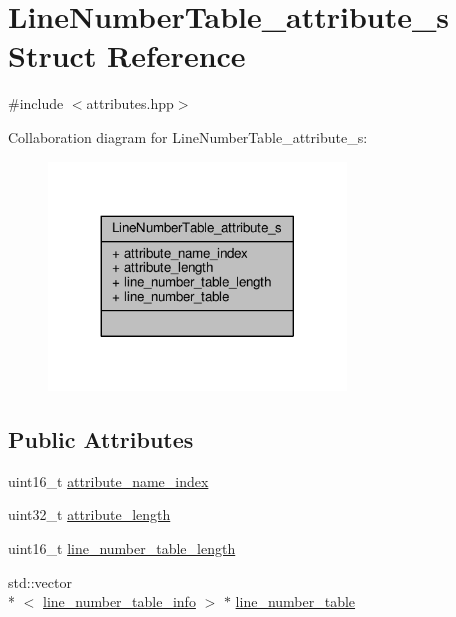 \hypertarget{structLineNumberTable__attribute__s}{\section{Line\+Number\+Table\+\_\+attribute\+\_\+s Struct Reference}
\label{structLineNumberTable__attribute__s}
}


{\ttfamily \#include $<$attributes.\+hpp$>$}



Collaboration diagram for Line\+Number\+Table\+\_\+attribute\+\_\+s\+:\nopagebreak
\begin{figure}[H]
\begin{center}
\leavevmode
\includegraphics[width=224pt]{structLineNumberTable__attribute__s__coll__graph}
\end{center}
\end{figure}
\subsection*{Public Attributes}
\begin{DoxyCompactItemize}
\item 
uint16\+\_\+t \hyperlink{structLineNumberTable__attribute__s_aac15efe1c90438dc07107171766d8637}{attribute\+\_\+name\+\_\+index}
\item 
uint32\+\_\+t \hyperlink{structLineNumberTable__attribute__s_ab542a17d507ee228ba3967068a20f990}{attribute\+\_\+length}
\item 
uint16\+\_\+t \hyperlink{structLineNumberTable__attribute__s_af17b7841355aa53d48fbfe84e34729c5}{line\+\_\+number\+\_\+table\+\_\+length}
\item 
std\+::vector\\*
$<$ \hyperlink{attributes_8hpp_a27b6c85369a912aa549462c1ede3cc99}{line\+\_\+number\+\_\+table\+\_\+info} $>$ $\ast$ \hyperlink{structLineNumberTable__attribute__s_a434f6fcd9cf968392ae7b9436c118e93}{line\+\_\+number\+\_\+table}
\end{DoxyCompactItemize}


